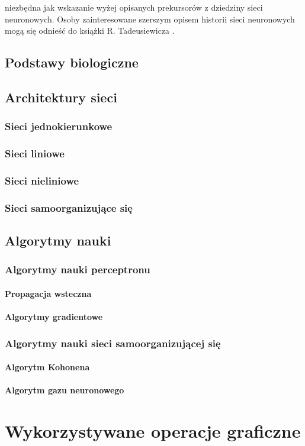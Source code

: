 niezbędna jak wskazanie wyżej opisanych prekursorów z dziedziny sieci neuronowych. Osoby zainteresowane szerszym opisem historii sieci neuronowych mogą się odnieść do książki R. Tadeusiewicza \cite{Tad93}.

\subsection{Podstawy biologiczne}

\subsection{Architektury sieci}
\subsubsection{Sieci jednokierunkowe}
\subsubsection{Sieci liniowe}
\subsubsection{Sieci nieliniowe}
\subsubsection{Sieci samoorganizujące się} 

\subsection{Algorytmy nauki}
\subsubsection{Algorytmy nauki perceptronu}
\paragraph{Propagacja wsteczna}
\paragraph{Algorytmy gradientowe}
\subsubsection{Algorytmy nauki sieci samoorganizującej się}
\paragraph{Algorytm Kohonena}
\paragraph{Algorytm gazu neuronowego}


\section{Wykorzystywane operacje graficzne}\label{sec:grafika}